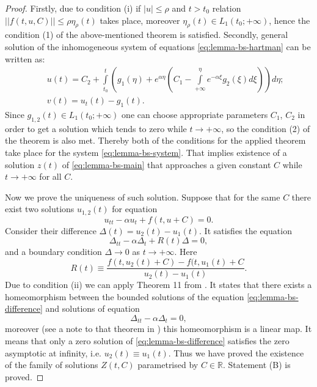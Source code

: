 \begin{proof}
	Firstly, due to condition (i) if $|u| \le \rho$ and $t > t_0$ relation $||f(t, u, C)|| \le \rho \eta_{\rho} (t)$ takes place, moreover $\eta_{\rho}(t) \in L_1(t_0; +\infty)$, hence the condition (1) of the above-mentioned theorem is satisfied.
	Secondly, general solution of the inhomogeneous system of equations \eqref{eq:lemma-bs-hartman} can be written as:
	\begin{eqnarray}
		&& u(t) = C_2 + \int \limits_{t_0}^{t} \left( g_1(\eta) + e^{\alpha \eta} \left( C_1 - \int \limits_{+\infty}^{\eta} e^{-\alpha \xi} g_2(\xi) d\xi \right) \right) d\eta; \\
		&& v(t) = u_t(t) - g_1(t).
	\end{eqnarray}
	Since $g_{1,2}(t) \in L_1(t_0; +\infty)$ one can choose appropriate parameters $C_1$, $C_2$ in order to get a solution which tends to zero while $t \to +\infty$, so the condition (2) of the theorem is also met.
	Thereby both of the conditions for the applied theorem take place for the system \eqref{eq:lemma-bs-system}.
	That implies existence of a solution $z(t)$ of \eqref{eq:lemma-bs-main} that approaches a given constant $C$ while $t \to +\infty$ for all $C$.
	
	Now we prove the uniqueness of such solution.
	Suppose that for the same $C$ there exist two solutions $u_{1,2}(t)$ for equation
	\begin{equation}
		u_{tt} - \alpha u_t + f(t, u + C) = 0.
		\label{eq:lemma-bs-u}
	\end{equation}
	Consider their difference $\Delta(t) = u_2(t) - u_1(t)$.
	It satisfies the equation
	\begin{equation}
		\Delta_{tt} - \alpha \Delta_t + R(t) \Delta = 0,
		\label{eq:lemma-bs-difference}
	\end{equation}
	and a boundary condition $\Delta \to 0$ as $t \to +\infty$.
	Here
	\begin{equation}
		R(t) \equiv \dfrac{f(t, u_2(t) +C) - f(t, u_1(t) + C}{u_2(t) - u_1(t)}.
	\end{equation}
	Due to condition (ii) we can apply Theorem 11 from \cite[Chapter 3]{Coppel}.
	It states that there exists a homeomorphism between the bounded solutions of the equation \eqref{eq:lemma-bs-difference} and solutions of equation
	\begin{equation}
		\Delta_{tt} - \alpha \Delta_t = 0,
	\end{equation}
	moreover (see a note to that theorem in \cite{Coppel}) this homeomorphism is a linear map.
	It means that only a zero solution of \eqref{eq:lemma-bs-difference} satisfies the zero asymptotic at infinity, i.e. $u_2(t) \equiv u_1(t)$.
	Thus we have proved the existence of the family of solutions $Z(t, C)$ parametrised by $C \in \mathbb{R}$.
	Statement (B) is proved.
	

\end{proof}
